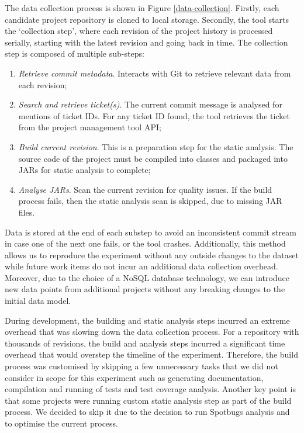\documentclass{mpaper}
\begin{document}
The data collection process is shown in Figure \ref{data-collection}. Firstly,
each candidate project repository is cloned to local storage. Secondly, the tool
starts the `collection step', where each revision of the project history is
processed serially, starting with the latest revision and going back in time.
The collection step is composed of multiple sub-steps:
\begin{enumerate}
  \item \emph{Retrieve commit metadata}. Interacts with Git to retrieve relevant
  data from each revision;
  \item \emph{Search and retrieve ticket(s)}. The current commit message is
  analysed for mentions of ticket IDs. For any ticket ID found, the tool
  retrieves the ticket from the project management tool API;
  \item \emph{Build current revision}. This is a preparation step for the static
  analysis. The source code of the project must be compiled into classes and
  packaged into JARs for static analysis to complete;
  \item \emph{Analyse JARs}. Scan the current revision for quality issues. If
  the build process fails, then the static analysis scan is skipped, due to
  missing JAR files. 
\end{enumerate}

Data is stored at the end of each substep to avoid an inconsistent commit stream
in case one of the next one fails, or the tool crashes. Additionally, this method
allows us to reproduce the experiment without any outside changes to the dataset
while future work items do not incur an additional data collection overhead.
Moreover, due to the choice of a NoSQL database technology, we can introduce new
data points from additional projects without any breaking changes to the initial
data model. 

During development, the building and static analysis steps incurred an extreme
overhead that was slowing down the data collection process. For a repository
with thousands of revisions, the build and analysis steps incurred a significant
time overhead that would overstep the timeline of the experiment. Therefore, the
build process was customised by skipping a few unnecessary tasks that we did not
consider in scope for this experiment such as generating documentation,
compilation and running of tests and test coverage analysis. Another key point
is that some projects were running custom static analysis step as part of the
build process. We decided to skip it due to the decision to run Spotbugs
analysis and to optimise the current process. 
\end{document}
